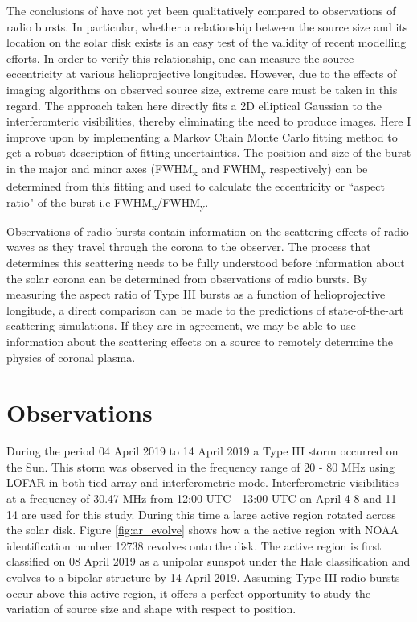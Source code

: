 The conclusions of \cite{Kontar2019} have not yet been qualitatively compared to observations of radio bursts. In particular, whether a relationship between the source size and its location on the solar disk exists is an easy test of the validity of recent modelling efforts. In order to verify this relationship, one can measure the source eccentricity at various helioprojective longitudes. However, due to the effects of imaging algorithms on observed source size, extreme care must be taken in this regard. The approach taken here directly fits a 2D elliptical Gaussian to the interferomteric visibilities, thereby eliminating the need to produce images. Here I improve upon \cite{Murphy2021} by implementing a Markov Chain Monte Carlo fitting method to get a robust description of fitting uncertainties. The position and size of the burst in the major and minor axes (FWHM\textsubscript{x} and FWHM\textsubscript{y} respectively) can be determined from this fitting and used to calculate the eccentricity or ``aspect ratio"  of the burst i.e FWHM\textsubscript{x}/FWHM\textsubscript{y}.

Observations of radio bursts contain information on the scattering effects of radio waves as they travel through the corona to the observer. The process that determines this scattering needs to be fully understood before information about the solar corona can be determined from observations of radio bursts.
By measuring the aspect ratio of Type III bursts as a function of helioprojective longitude, a direct comparison can be made to the predictions of state-of-the-art scattering simulations. If they are in agreement, we may be able to use information about the scattering effects on a source to remotely determine the physics of coronal plasma.

\section{Observations}
\label{obsvtheory_observations}
During the period 04 April 2019 to 14 April 2019 a Type III storm occurred on the Sun. This storm was observed in the frequency range of 20 - 80 MHz using LOFAR in both tied-array and interferometric mode. Interferometric visibilities at a frequency of 30.47 MHz from 12:00 UTC - 13:00 UTC on April 4-8 and 11-14 are used for this study. During this time a large active region rotated across the solar disk. Figure \ref{fig:ar_evolve} shows how a the active region with NOAA identification number 12738 revolves onto the disk. The active region is first classified on 08 April 2019 as a unipolar sunspot under the Hale classification and evolves to a bipolar structure by 14 April 2019. Assuming Type III radio bursts occur above this active region, it offers a perfect opportunity to study the variation of source size and shape with respect to position. 

